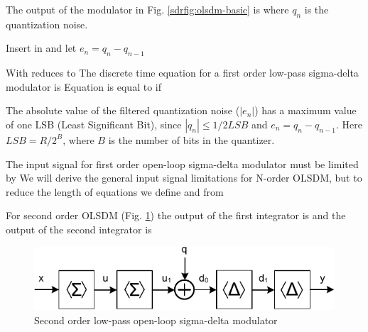 The output of the modulator in Fig. \ref{sdrfig:olsdm-basic}
is
where $q_n$ is the quantization noise. 

Insert  in
 and let $e_n = q_n - q_{n-1}$

With    reduces to
The discrete time equation for a first order low-pass sigma-delta
modulator is
Equation  is equal to  if 

The absolute value of the filtered quantization noise ($|e_n|$) has a
maximum value of one LSB (Least
Significant Bit), since $|q_n| \leq 1/2 LSB$ and $e_n = q_n -
q_{n-1}$. Here $LSB = R/2^B$, where $B$ is the number of 
bits in the quantizer. 

The input signal for first order open-loop
sigma-delta modulator must be limited by 
We will derive the general input signal limitations for N-order OLSDM,
but to reduce the length of equations we define
and from 

For second order OLSDM (Fig. \ref{sdrfig:mod2}) the
output of the first integrator is
and the output of the second integrator is

\begin{figure}[htbp]
\centerline{ \includegraphics[width=\myfigwidth]{graphics/osd2}}
  \caption{Second order low-pass open-loop sigma-delta modulator}
  \label{sdrfig:mod2}
\end{figure}

